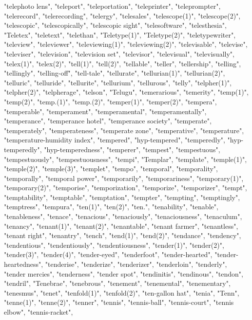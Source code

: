 "telephoto lens",
"teleport",
"teleportation",
"teleprinter",
"teleprompter",
"telerecord",
"telerecording",
"telergy",
"telesales",
"telescope(1)",
"telescope(2)",
"telescopic",
"telescopically",
"telescopic sight",
"telesoftware",
"telesthesia",
"Teletex",
"teletext",
"telethan",
"Teletype(1)",
"Teletype(2)",
"teletypewriter",
"teleview",
"televiewer",
"televiewing(1)",
"televiewing(2)",
"televisable",
"televise",
"televiser",
"television",
"television set",
"televisor",
"televisual",
"televisually",
"telex(1)",
"telex(2)",
"tell(1)",
"tell(2)",
"tellable",
"teller",
"tellership",
"telling",
"tellingly",
"telling-off",
"tell-tale",
"tellurate",
"tellurian(1)",
"tellurian(2)",
"telluric",
"telluride",
"tellurite",
"tellurium",
"tellurous",
"telly",
"telpher(1)",
"telpher(2)",
"telpherage",
"telson",
"Telugu",
"temerarious",
"temerity",
"temp(1)",
"temp(2)",
"temp.(1)",
"temp.(2)",
"temper(1)",
"temper(2)",
"tempera",
"temperable",
"temperament",
"temperamental",
"temperamentally",
"temperance",
"temperance hotel",
"temperance society",
"temperate",
"temperately",
"temperateness",
"temperate zone",
"temperative",
"temperature",
"temperature-humidity index",
"tempered",
"hyp-tempered",
"temperedly",
"hyp-temperedly",
"hyp-temperedness",
"temperer",
"tempest",
"tempestuous",
"tempestuously",
"tempestuousness",
"tempi",
"Templar",
"template",
"temple(1)",
"temple(2)",
"temple(3)",
"templet",
"tempo",
"temporal",
"temporality",
"temporally",
"temporal power",
"temporarily",
"temporariness",
"temporary(1)",
"temporary(2)",
"temporise",
"temporization",
"temporize",
"temporizer",
"tempt",
"temptability",
"temptable",
"temptation",
"tempter",
"tempting",
"temptingly",
"temptress",
"tempura",
"ten(1)",
"ten(2)",
"ten.",
"tenability",
"tenable",
"tenableness",
"tenace",
"tenacious",
"tenaciously",
"tenaciousness",
"tenaculum",
"tenancy",
"tenant(1)",
"tenant(2)",
"tenantable",
"tenant farmer",
"tenantless",
"tenant right",
"tenantry",
"tench",
"tend(1)",
"tend(2)",
"tendance",
"tendency",
"tendentious",
"tendentiously",
"tendentiousness",
"tender(1)",
"tender(2)",
"tender(3)",
"tender(4)",
"tender-eyed",
"tenderfoot",
"tender-hearted",
"tender-heartedness",
"tenderise",
"tenderize",
"tenderizer",
"tenderloin",
"tenderly",
"tender mercies",
"tenderness",
"tender spot",
"tendinitis",
"tendinous",
"tendon",
"tendril",
"Tenebrae",
"tenebrous",
"tenement",
"tenemental",
"tenementary",
"tenesmus",
"tenet",
"tenfold(1)",
"tenfold(2)",
"ten-gallon hat",
"tenia",
"Tenn",
"tenne(1)",
"tenne(2)",
"tenner",
"tennis",
"tennis-ball",
"tennis-court",
"tennis elbow",
"tennis-racket",
